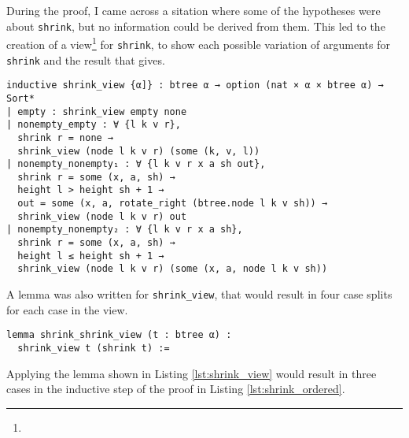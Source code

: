 During the proof, I came across a sitation where some of the hypotheses were about \lstinline{shrink}, but no information could be derived from them. This led to the creation of a view\footnote{} for \lstinline{shrink}, to show each possible variation of arguments for \lstinline{shrink} and the result that gives.

\begin{lstlisting}[caption=\empty]
inductive shrink_view {α]} : btree α → option (nat × α × btree α) → Sort*
| empty : shrink_view empty none
| nonempty_empty : ∀ {l k v r},
  shrink r = none →
  shrink_view (node l k v r) (some (k, v, l))
| nonempty_nonempty₁ : ∀ {l k v r x a sh out},
  shrink r = some (x, a, sh) →
  height l > height sh + 1 →
  out = some (x, a, rotate_right (btree.node l k v sh)) →
  shrink_view (node l k v r) out
| nonempty_nonempty₂ : ∀ {l k v r x a sh},
  shrink r = some (x, a, sh) →
  height l ≤ height sh + 1 →
  shrink_view (node l k v r) (some (x, a, node l k v sh))
\end{lstlisting}

A lemma was also written for \lstinline{shrink_view}, that would result in four case splits for each case in the view. 

\begin{lstlisting}[caption=\empty, label={lst:shrink_view}]
lemma shrink_shrink_view (t : btree α) : 
  shrink_view t (shrink t) :=
\end{lstlisting}

Applying the lemma shown in Listing \ref{lst:shrink_view} would result in three cases in the inductive step of the proof in Listing \ref{lst:shrink_ordered}.